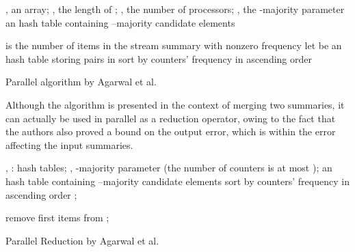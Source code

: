 \documentclass[final,3p,times]{elsarticle}
\begin{document}
\begin{algorithm}
\begin{algorithmic}[1]
\Require , an array; , the length of ; , the number of processors; , the -majority parameter
\Ensure an hash table containing --majority candidate elements
\State 
\State 
\State 
{}

	\If{} \Comment  is the number of items in the stream summary  with nonzero frequency
		\State 
			\State 
		\EndFor
	\EndIf
\State let  be an hash table storing  pairs in 
\State sort  by counters' frequency in ascending order
\State 
{}
\If{} 
	\State \Return 
\EndIf
\EndProcedure
\caption{Parallel algorithm by Agarwal et al.}
\label{pa}
\end{algorithmic}
\end{algorithm}

Although the algorithm is presented in the context of merging two summaries, it can actually be used in parallel as a reduction operator, owing to the fact that the authors also proved a bound on the output error, which is within the error affecting the input summaries.


\begin{algorithm}
\begin{algorithmic}[1]
\Require , : hash tables; , -majority parameter (the number of counters is at most );
\Ensure an hash table containing --majority candidate elements
 
\State 
\State sort  by counters' frequency in ascending order
\If{}
	\State \Return ;
\Else {}

	\State 
	\State 
		\State 	
		\State 
		\State 
		\State 
		\State 	
		\State 
		\State 
	\EndFor
	\State remove first  items from 
	\State \Return ;
\EndIf
\EndProcedure
\caption{Parallel Reduction by Agarwal et al.}
\label{par}
\end{algorithmic}
\end{algorithm}
\end{document}
